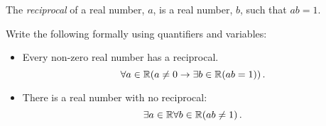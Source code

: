 \guard




\begin{exmp}
\label{exmp:reciprocal}
  The \emph{reciprocal} of a real number, $a$, is a real number, $b$, such that $ab=1$.

  Write the following formally using quantifiers and variables:
  \begin{itemize}
    \item Every non-zero real number has a reciprocal.\\
      \[ \forall a\in\mathbb{R}( a\not=0\rightarrow\exists b\in\mathbb{R}(ab=1))\,.\]
    \item There is a real number with no reciprocal:
      \[\exists a\in\mathbb{R}\forall b\in\mathbb{R}(ab\not=1)\,.\]
  \end{itemize}
\end{exmp}
